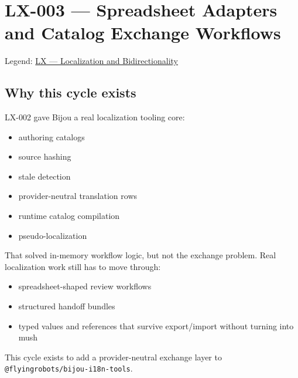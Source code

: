 \chapter{LX-003 --- Spreadsheet Adapters and Catalog Exchange Workflows}\label{record-190}

\smallskip

Legend: \href{https://github.com/flyingrobots/bijou/blob/1853ad902f6bf219326409e7f743a5a1d6517dbc/docs/legends/LX-localization-and-bidirectionality.md}{LX --- Localization and Bidirectionality}

\section{Why this cycle exists}\label{record-190-why-this-cycle-exists}

LX-002 gave Bijou a real localization tooling core:

\begin{itemize}
\tightlist
\item
  authoring catalogs
\item
  source hashing
\item
  stale detection
\item
  provider-neutral translation rows
\item
  runtime catalog compilation
\item
  pseudo-localization
\end{itemize}

That solved in-memory workflow logic, but not the exchange problem. Real localization work still has to move through:

\begin{itemize}
\tightlist
\item
  spreadsheet-shaped review workflows
\item
  structured handoff bundles
\item
  typed values and references that survive export/import without turning into mush
\end{itemize}

This cycle exists to add a provider-neutral exchange layer to \texttt{@\allowbreak{}f\allowbreak{}l\allowbreak{}y\allowbreak{}i\allowbreak{}n\allowbreak{}g\allowbreak{}r\allowbreak{}o\allowbreak{}b\allowbreak{}o\allowbreak{}t\allowbreak{}s\allowbreak{}/\allowbreak{}b\allowbreak{}i\allowbreak{}j\allowbreak{}o\allowbreak{}u\allowbreak{}-\allowbreak{}i\allowbreak{}1\allowbreak{}8\allowbreak{}n\allowbreak{}-\allowbreak{}t\allowbreak{}o\allowbreak{}o\allowbreak{}l\allowbreak{}s}.

